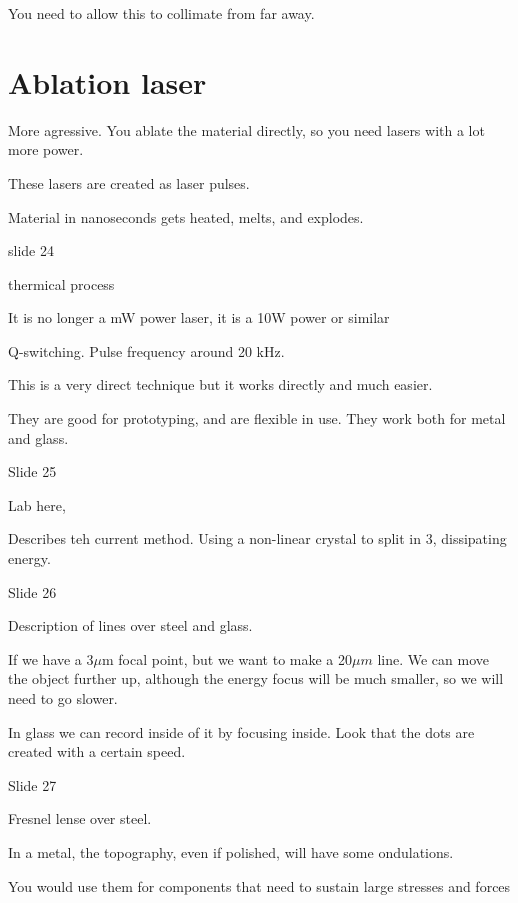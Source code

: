 \documentclass[../main/main.tex]{subfiles}
\begin{document}
You need to allow this to collimate from far away.

\section{Ablation laser}

More agressive. You ablate the material directly, so you need lasers with a lot more power.

These lasers are created as laser pulses.

Material in nanoseconds gets heated, melts, and explodes.


slide 24

thermical process

It is no longer a mW power laser, it is a 10W power or similar

Q-switching. Pulse frequency around 20 kHz.

This is a very direct technique but it works directly and much easier.

They are good for prototyping, and are flexible in use. They work both for metal and glass.

Slide 25

Lab here,

Describes teh current method. Using a non-linear crystal to split in 3, dissipating energy.

Slide 26

Description of lines over steel and glass.

If we have a 3$\mu$m focal point, but we want to make a 20$\mu m$ line. We can move the object further up, although the energy focus will be much smaller, so we will need to go slower.

In glass we can record inside of it by focusing inside. Look that the dots are created with a certain speed.

Slide 27

Fresnel lense over steel.

In a metal, the topography, even if polished, will have some ondulations.

You would use them for components that need to sustain large stresses and forces
\end{document}
